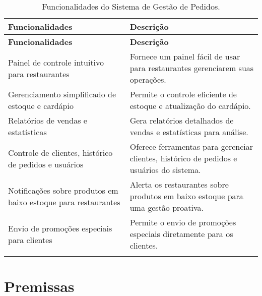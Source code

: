 \begin{center}
    

\begin{longtable}{|p{4cm}|p{10cm}|}
\hline
\textbf{Funcionalidades} & \textbf{Descrição} \\
\hline
\endfirsthead

\hline
\textbf{Funcionalidades} & \textbf{Descrição} \\
\hline
\endhead

Painel de controle intuitivo para restaurantes & Fornece um painel fácil de usar para restaurantes gerenciarem suas operações. \\
\hline
Gerenciamento simplificado de estoque e cardápio & Permite o controle eficiente de estoque e atualização do cardápio. \\
\hline
Relatórios de vendas e estatísticas & Gera relatórios detalhados de vendas e estatísticas para análise. \\
\hline
Controle de clientes, histórico de pedidos e usuários & Oferece ferramentas para gerenciar clientes, histórico de pedidos e usuários do sistema. \\
\hline
Notificações sobre produtos em baixo estoque para restaurantes & Alerta os restaurantes sobre produtos em baixo estoque para uma gestão proativa. \\
\hline
Envio de promoções especiais para clientes & Permite o envio de promoções especiais diretamente para os clientes. \\
\hline
\caption{Funcionalidades do Sistema de Gestão de Pedidos.}
\label{tab:sis_gestao}
\end{longtable}
\end{center}

\section{Premissas}



